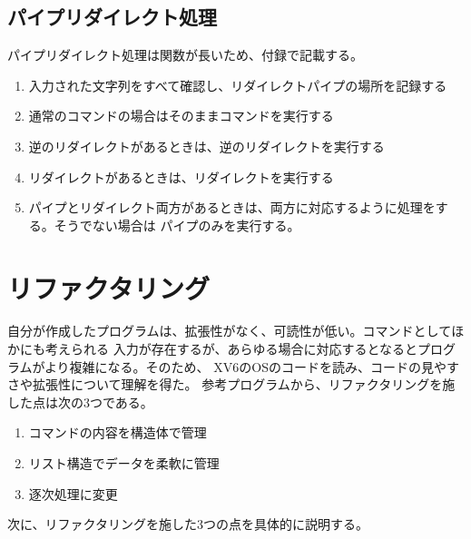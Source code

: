 \documentclass[a4j, twocolumn]{ltjsarticle}
\begin{document}
      \subsection{パイプリダイレクト処理}
      パイプリダイレクト処理は関数が長いため、付録で記載する。
      \begin{enumerate}
        \item 入力された文字列をすべて確認し、リダイレクトパイプの場所を記録する
        \item 通常のコマンドの場合はそのままコマンドを実行する
        \item 逆のリダイレクトがあるときは、逆のリダイレクトを実行する
        \item リダイレクトがあるときは、リダイレクトを実行する
        \item パイプとリダイレクト両方があるときは、両方に対応するように処理をする。そうでない場合は
        パイプのみを実行する。
      \end{enumerate}

  \section{リファクタリング}
    自分が作成したプログラムは、拡張性がなく、可読性が低い。コマンドとしてほかにも考えられる
    入力が存在するが、あらゆる場合に対応するとなるとプログラムがより複雑になる。そのため、
    XV6のOSのコードを読み、コードの見やすさや拡張性について理解を得た。
    参考プログラムから、リファクタリングを施した点は次の3つである。
    \begin{enumerate}
      \item コマンドの内容を構造体で管理
      \item リスト構造でデータを柔軟に管理
      \item 逐次処理に変更
    \end{enumerate}
    次に、リファクタリングを施した3つの点を具体的に説明する。
\end{document}
